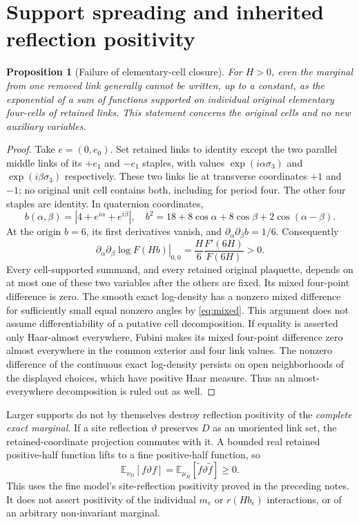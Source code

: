 \documentclass[11pt]{article}
\newtheorem{proposition}[theorem]{Proposition}
\theoremstyle{definition}
\theoremstyle{remark}
\newcommand{\E}{\mathbb E}
\begin{document}
\section{Support spreading and inherited reflection positivity}
\begin{proposition}[Failure of elementary-cell closure]\label{prop:nonclosure}
For $H>0$, even the marginal from one removed link generally cannot be
written, up to a constant, as the exponential of a sum of functions
supported on individual original elementary four-cells of retained links.
This statement concerns the original cells and no new auxiliary variables.
\end{proposition}
\begin{proof}
Take $e=(0,e_0)$. Set retained links to identity except the two parallel
middle links of its $+e_1$ and $-e_1$ staples, with values
$\exp(i\alpha\sigma_3)$ and $\exp(i\beta\sigma_3)$ respectively. These
two links lie at transverse coordinates $+1$ and $-1$; no original
unit cell contains both, including for period four. The other four
staples are identity. In quaternion coordinates,
\[
 b(\alpha,\beta)=|4+e^{i\alpha}+e^{i\beta}|,\quad
 b^2=18+8\cos\alpha+8\cos\beta+2\cos(\alpha-\beta).
\]
At the origin $b=6$, its first derivatives vanish, and
$\partial_\alpha\partial_\beta b=1/6$. Consequently
\begin{equation}
 \left.\partial_\alpha\partial_\beta\log F(Hb)\right|_{0,0}
 =\frac H6\frac{F'(6H)}{F(6H)}>0.
 \label{eq:mixed}
\end{equation}
Every cell-supported summand, and every retained original plaquette,
depends on at most one of these two variables after the others are fixed.
Its mixed four-point difference is zero. The smooth exact log-density
has a nonzero mixed difference for sufficiently small equal nonzero
angles by \eqref{eq:mixed}. This argument does not assume differentiability
of a putative cell decomposition. If equality is asserted only Haar-almost
everywhere, Fubini makes its mixed four-point difference zero almost
everywhere in the common exterior and four link values. The nonzero
difference of the continuous exact log-density persists on open
neighborhoods of the displayed choices, which have positive Haar measure.
Thus an almost-everywhere decomposition is ruled out as well.
\end{proof}
Larger supports do not by themselves destroy reflection positivity of
the \emph{complete exact marginal}. If a site reflection $\vartheta$
preserves $D$ as an unoriented link set, the retained-coordinate projection
commutes with it. A bounded real retained positive-half function lifts to a
fine positive-half function, so
\begin{equation}
 \E_{\nu_D}[f\vartheta f]=\E_{\mu_H}[\widetilde f\vartheta\widetilde f]
 \ge0.
 \label{eq:rp}
\end{equation}
This uses the fine model's site-reflection positivity proved in the
preceding notes. It does not assert positivity of the individual
$m_e$ or $r(Hb_e)$ interactions, or of an arbitrary non-invariant marginal.
\end{document}
